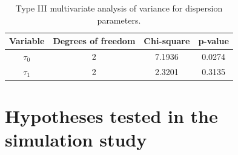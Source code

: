 \documentclass[AMA,STIX1COL]{WileyNJD-v2}
\begin{document}

\begin{table}[H]
\centering
\begin{tabular}{cccc}
\hline
Variable               & Degrees of freedom & Chi-square & p-value        \\ \hline
$\tau_0$ & 2                  & 7.1936       & 0.0274  \\
$\tau_1$ & 2                  & 2.3201       & 0.3135         \\ \hline
\end{tabular}
\caption{Type III multivariate analysis of variance for dispersion parameters.}
\label{tab8}
\end{table}


\appendix

\section{Hypotheses tested in the simulation study\label{app1}}

\end{document}

